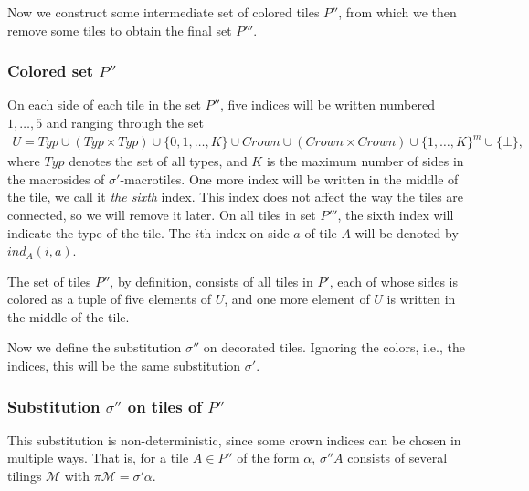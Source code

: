\documentclass[12pt]{article}
\theoremstyle{remark}
\newcommand{\pair}[1]{\langle #1\rangle}
\newcommand{\crown}{\textit{Crown}}
\newcommand{\types}{\textit{Typ}}
\newcommand{\undef}{\bot}
\begin{document}
Now we construct some intermediate set of colored tiles $P''$,
from which we then remove some tiles to obtain the final set $P'''$.

\subsubsection{Colored set $P''$}
\newcommand{\ind}{\textit{ind}}

On each side of each tile in the set $P''$, five indices will be written
numbered $1,\dots,5$ and ranging through the set
\begin{align*}
U=\types\cup(\types\times\types)\cup\{0,1,\dots,K\}\cup\crown\cup(\crown\times\crown)
\cup\{1,\dots,K\}^m\cup\{\undef\},
\end{align*}
where $\types$ denotes the set of all types, and $K$ is the maximum number of sides
in the macrosides of $\sigma'$-macrotiles. 
One more index will be written in the middle of the tile,
we call it \emph{the sixth} index.
This index does not affect the way the tiles are connected, so we will remove it later. On all tiles in set $P'''$, the sixth index will indicate the type of the tile.
The $i$th index on side $a$ of tile $A$ will be denoted by $\ind_A(i,a)$.

The set of tiles $P''$, by definition, consists of all tiles in 
$P'$, each of whose sides is colored as a tuple of five elements of $U$,
and one more element of $U$ is written in the middle of the tile.

Now we define the substitution $\sigma''$ on decorated tiles.
Ignoring the colors, i.e., the indices, this will be the same substitution
$\sigma'$.

\subsubsection{Substitution $\sigma''$ on tiles of $P''$}\label{s263}
\newcommand{\cld}{\text{Ch}}

This substitution is non-deterministic, since some 
crown indices can be chosen in multiple ways.
That is, for a tile $A\in P''$ of the form $\alpha$,  $\sigma'' A$ consists
of several %
tilings $\mathcal M$ with $\pi\mathcal M=\sigma'\alpha$.
\end{document}
